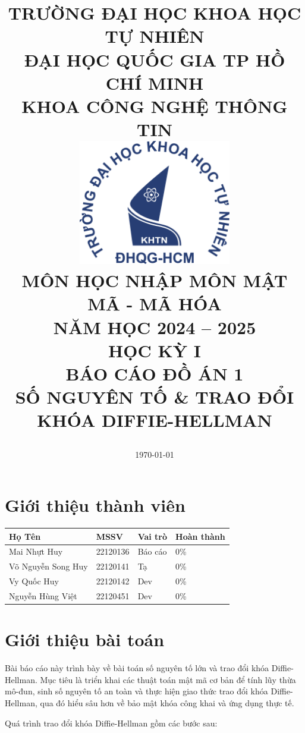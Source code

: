 \documentclass[a4paper,12pt]{article}
\title{
    \begin{center}
   
    \Large \textbf{TRƯỜNG ĐẠI HỌC KHOA HỌC TỰ NHIÊN} \\
    \textbf{ĐẠI HỌC QUỐC GIA TP HỒ CHÍ MINH} \\
    \textbf{KHOA CÔNG NGHỆ THÔNG TIN} \\[2cm]
    \includegraphics[width=0.5\textwidth]{logo.png}\\[2cm] %
    \textbf{MÔN HỌC NHẬP MÔN MẬT MÃ - MÃ HÓA}\\
    \textbf{NĂM HỌC 2024 – 2025}\\
    \textbf{HỌC KỲ I}\\
    \textbf{BÁO CÁO ĐỒ ÁN 1}\\
    \textbf{SỐ NGUYÊN TỐ \& TRAO ĐỔI KHÓA DIFFIE-HELLMAN}\\

    \end{center}
}
\date{\today}
\begin{document}
\maketitle
\newpage
\tableofcontents
\newpage

\section{Giới thiệu thành viên}
\begin{center}
\begin{tabular}{|l|l|l|l|} %
\hline %
\textbf{Họ Tên} & \textbf{MSSV} & \textbf{Vai trò} & \textbf{Hoàn thành} \\ \hline
Mai Nhựt Huy & 22120136 & Báo cáo & 0\% \\ \hline
Võ Nguyễn Song Huy & 22120141 & Tạ & 0\% \\ \hline
Vy Quốc Huy & 22120142 & Dev & 0\% \\ \hline
Nguyễn Hùng Việt & 22120451 & Dev & 0\% \\ \hline
\end{tabular}
\end{center}

\section{Giới thiệu bài toán}
Bài báo cáo này trình bày về bài toán số nguyên tố lớn và trao đổi khóa Diffie-Hellman. Mục tiêu là triển khai các thuật toán mật mã cơ bản để tính lũy thừa mô-đun, sinh số nguyên tố an toàn và thực hiện giao thức trao đổi khóa Diffie-Hellman, qua đó hiểu sâu hơn về bảo mật khóa công khai và ứng dụng thực tế.

Quá trình trao đổi khóa Diffie-Hellman gồm các bước sau:
\end{document}
